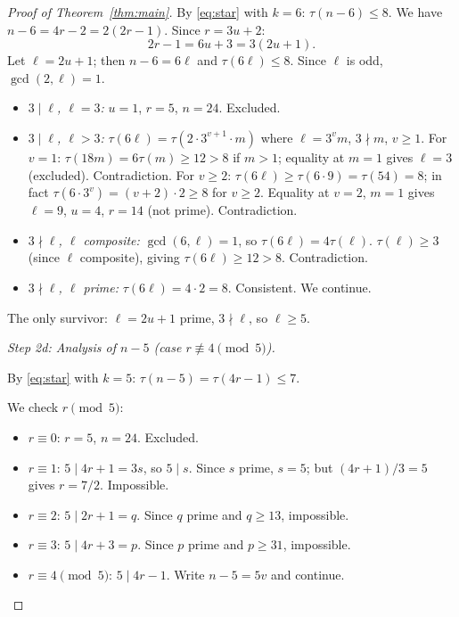\documentclass[11pt]{article}
\begin{document}
\begin{proof}[Proof of Theorem~\ref{thm:main}]
By \eqref{eq:star} with $k = 6$: $\tau(n-6) \le 8$.
We have $n - 6 = 4r - 2 = 2(2r-1)$.
Since $r = 3u + 2$:
\[
  2r - 1 = 6u + 3 = 3(2u + 1).
\]
Let $\ell = 2u + 1$; then $n - 6 = 6\ell$ and $\tau(6\ell) \le 8$.
Since $\ell$ is odd, $\gcd(2,\ell) = 1$.

\begin{itemize}
\item \emph{$3 \mid \ell$, $\ell = 3$:} $u = 1$, $r = 5$, $n = 24$. Excluded.
\item \emph{$3 \mid \ell$, $\ell > 3$:} $\tau(6\ell) = \tau(2 \cdot 3^{v+1}
  \cdot m)$ where $\ell = 3^v m$, $3 \nmid m$, $v \ge 1$.
  For $v = 1$: $\tau(18m) = 6\tau(m) \ge 12 > 8$ if $m > 1$; equality at
  $m = 1$ gives $\ell = 3$ (excluded). Contradiction.
  For $v \ge 2$: $\tau(6\ell) \ge \tau(6 \cdot 9) = \tau(54) = 8$; in fact
  $\tau(6 \cdot 3^v) = (v+2) \cdot 2 \ge 8$ for $v \ge 2$. Equality at $v = 2$,
  $m = 1$ gives $\ell = 9$, $u = 4$, $r = 14$ (not prime). Contradiction.
\item \emph{$3 \nmid \ell$, $\ell$ composite:} $\gcd(6,\ell) = 1$, so
  $\tau(6\ell) = 4\tau(\ell)$.
  $\tau(\ell) \ge 3$ (since $\ell$ composite), giving $\tau(6\ell) \ge 12 > 8$.
  Contradiction.
\item \emph{$3 \nmid \ell$, $\ell$ prime:} $\tau(6\ell) = 4 \cdot 2 = 8$.
  Consistent. We continue.
\end{itemize}

\noindent The only survivor: $\ell = 2u + 1$ prime, $3 \nmid \ell$, so $\ell \ge 5$.

\medskip
\noindent\textit{Step 2d: Analysis of $n - 5$ (case $r \not\equiv 4 \pmod 5$).}

By \eqref{eq:star} with $k = 5$: $\tau(n-5) = \tau(4r-1) \le 7$.

We check $r \pmod 5$:
\begin{itemize}
\item $r \equiv 0$: $r = 5$, $n = 24$. Excluded.
\item $r \equiv 1$: $5 \mid 4r+1 = 3s$, so $5 \mid s$.
  Since $s$ prime, $s = 5$; but $(4r+1)/3 = 5$ gives $r = 7/2$. Impossible.
\item $r \equiv 2$: $5 \mid 2r+1 = q$. Since $q$ prime and $q \ge 13$, impossible.
\item $r \equiv 3$: $5 \mid 4r+3 = p$. Since $p$ prime and $p \ge 31$, impossible.
\item $r \equiv 4 \pmod 5$: $5 \mid 4r - 1$. Write $n - 5 = 5v$ and continue.
\end{itemize}


\end{proof}
\end{document}
